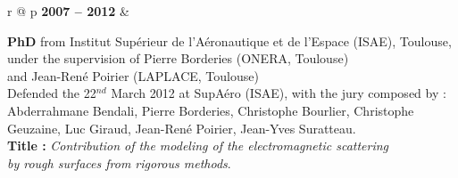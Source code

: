 \documentclass[a4paper,10pt,twoside]{article}
\newlength{\texte}
\newlength{\textelarge}
\begin{document}
\begin{tabular}{r @{\qquad} p{\textelarge}}
  \textbf{2007 -- 2012} &
  \begin{minipage}[t]{\linewidth}
    \textbf{PhD}
    from Institut Supérieur de l'Aéronautique et de l'Espace (ISAE),
    Toulouse,\\
    under the supervision of
    \textsf{Pierre Borderies} (ONERA, Toulouse)\\
    and \textsf{Jean-René Poirier} {(LAPLACE, Toulouse)}\\ %
    Defended the 22${}^{nd}$ March 2012 at SupAéro (ISAE),
    with the jury composed by :
    Abderrahmane Bendali, Pierre Borderies, Christophe Bourlier,
    Christophe Geuzaine, Luc Giraud, Jean-René Poirier,
    Jean-Yves Suratteau.\\
    \textbf{Title :}
    \emph{Contribution of the modeling
      of the electromagnetic scattering}\\
      \emph{by rough surfaces
      from rigorous methods}.\\
  \end{minipage} \\[1ex]



\end{tabular}
\end{document}
